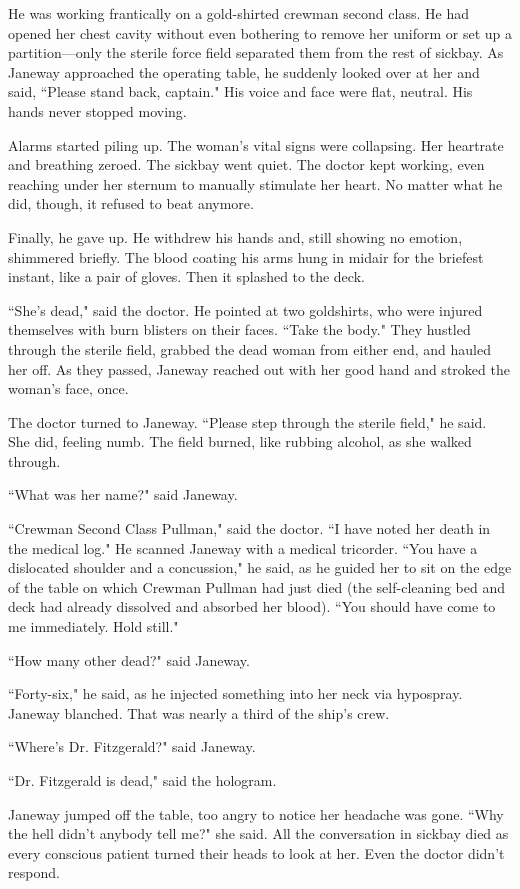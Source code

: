 \documentclass[twoside,letterpaper,12pt]{memoir}
\begin{document}
He was working frantically on a gold-shirted crewman second class. He had opened her chest cavity without even bothering to remove her uniform or set up a partition---only the sterile force field separated them from the rest of sickbay. As Janeway approached the operating table, he suddenly looked over at her and said, ``Please stand back, captain." His voice and face were flat, neutral. His hands never stopped moving.

Alarms started piling up. The woman's vital signs were collapsing. Her heartrate and breathing zeroed. The sickbay went quiet. The doctor kept working, even reaching under her sternum to manually stimulate her heart. No matter what he did, though, it refused to beat anymore.

Finally, he gave up. He withdrew his hands and, still showing no emotion, shimmered briefly. The blood coating his arms hung in midair for the briefest instant, like a pair of gloves. Then it splashed to the deck.

``She's dead," said the doctor. He pointed at two goldshirts, who were injured themselves with burn blisters on their faces. ``Take the body." They hustled through the sterile field, grabbed the dead woman from either end, and hauled her off. As they passed, Janeway reached out with her good hand and stroked the woman's face, once.

The doctor turned to Janeway. ``Please step through the sterile field," he said. She did, feeling numb. The field burned, like rubbing alcohol, as she walked through.

``What was her name?" said Janeway.

``Crewman Second Class Pullman," said the doctor. ``I have noted her death in the medical log." He scanned Janeway with a medical tricorder. ``You have a dislocated shoulder and a concussion," he said, as he guided her to sit on the edge of the table on which Crewman Pullman had just died (the self-cleaning bed and deck had already dissolved and absorbed her blood). ``You should have come to me immediately. Hold still."

``How many other dead?" said Janeway.

``Forty-six," he said, as he injected something into her neck via hypospray. Janeway blanched. That was nearly a third of the ship's crew.

``Where's Dr. Fitzgerald?" said Janeway.

``Dr. Fitzgerald is dead," said the hologram.

Janeway jumped off the table, too angry to notice her headache was gone. ``Why the hell didn't anybody tell me?" she said. All the conversation in sickbay died as every conscious patient turned their heads to look at her. Even the doctor didn't respond.
\end{document}
